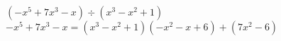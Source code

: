 {$\left(-x^{5} + 7x^{3} - x \right) \div \left(x^{3} - x^{2} + 1 \right)$}
{$-x^{5} + 7x^{3} - x = \left(x^{3} - x^{2} + 1 \right) \left(-x^{2} - x + 6 \right) + \left(7x^{2} - 6 \right)$}